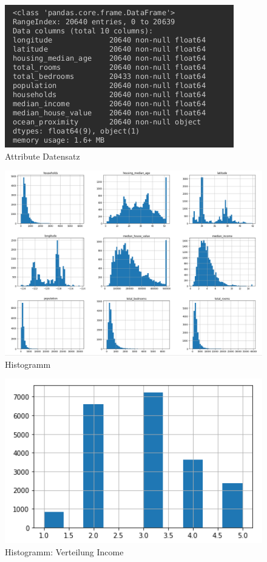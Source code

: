 \begin{figure}
	\includegraphics[]{../Bilder/pasted image 0 (8).png}
	\caption{Attribute Datensatz}
\end{figure}
\begin{figure}
	\includegraphics[width=1.0\textwidth]{../Bilder/pasted image 0 (9).png}
	\caption{Histogramm}
\end{figure}
\begin{figure}
	\includegraphics[width=1.0\textwidth]{../Bilder/pasted image 0 (10).png}
	\caption{Histogramm: Verteilung Income}
\end{figure}


